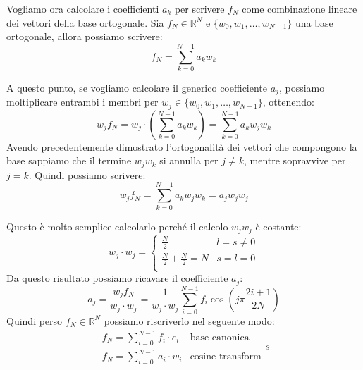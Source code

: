 Vogliamo ora calcolare i coefficienti $a_k$ per scrivere $f_N$ come combinazione
lineare dei vettori della base ortogonale. Sia $f_N \in \mathbb{R}^N$ e
$\{w_0,w_1,\dots,w_{N-1}\}$ una base ortogonale, allora possiamo scrivere:
\begin{equation*}
    f_N = \sum_{k=0}^{N-1} a_k w_k
\end{equation*}

A questo punto, se vogliamo calcolare il generico coefficiente $a_j$, possiamo
moltiplicare entrambi i membri per $w_j\in \{w_0,w_1,\dots,w_{N-1}\}$, ottenendo:
\begin{equation*}
    w_j f_N = w_j \cdot \left(\sum_{k=0}^{N-1} a_k w_k\right) = \sum_{k=0}^{N-1} a_k w_j w_k
\end{equation*}
Avendo precedentemente dimostrato l'ortogonalità dei vettori che compongono la
base sappiamo che il termine $w_j w_k$ si annulla per $j \neq k$, mentre sopravvive
per $j = k$. Quindi possiamo scrivere:
\begin{equation*}
    w_j f_N = \sum_{k=0}^{N-1} a_k w_j w_k = a_j w_j w_j
\end{equation*}

Questo è molto semplice calcolarlo perché il calcolo $w_j w_j$ è costante:
\begin{equation*}
    w_j \cdot w_j = \begin{cases}
        \frac{N}{2}                   & l = s  \ne 0 \\
        \frac{N}{2} + \frac{N}{2} = N & s=l =0       \\
    \end{cases}
\end{equation*}
Da questo risultato possiamo ricavare il coefficiente $a_j$:
\begin{equation*}
    a_j = \frac{w_j f_N}{w_j \cdot w_j} = \frac{1}{w_j \cdot w_j} \sum_{i=0}^{N-1}
    f_i \cos\left(j\pi \frac{2i+1}{2N}\right)
\end{equation*}
Quindi perso $f_N\in \mathbb{R}^N$ possiamo riscriverlo nel seguente modo:
\begin{equation*}
    \begin{array}{cl}
        f_N = \sum_{i=0}^{N-1} f_i \cdot e_i & \text{base canonica}    \\
        f_N = \sum_{i=0}^{N-1} a_i \cdot w_i & \text{cosine transform}
    \end{array}
s\end{equation*}

